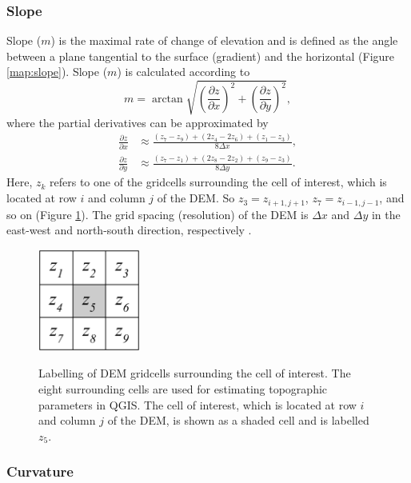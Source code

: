 \documentclass{sfuthesis}
\begin{document}
\subsubsection*{Slope} 

Slope ($m$) is the maximal rate of change of elevation and is defined as the angle between a plane tangential to the surface (gradient) and the horizontal \citep{Olaya2009} (Figure \ref{map:slope}). Slope ($m$) is calculated according to 
\begin{equation}
m = \arctan \sqrt{\left( \frac{\partial z}{\partial x} \right) ^2 + \left( \frac{\partial z}{\partial y} \right) ^2},
\end{equation}
where the partial derivatives can be approximated by \citep{Mitavsova1993, Neteler2008, Hofierka2009}
\begin{align} \label{eq:firstpartial}
\frac{\partial z}{\partial x} &\approx \frac{(z_7-z_9)+(2z_4-2z_6)+(z_1-z_3)}{8  \Delta x},\nonumber \\
\frac{\partial z}{\partial y} &\approx \frac{(z_7-z_1)+(2z_8-2z_2)+(z_9-z_3)}{8  \Delta y}.
\end{align}
Here, $z_k$ refers to one of the gridcells surrounding the cell of interest, which is located at row $i$ and column $j$ of the DEM. So $z_3 = z_{i+1,j+1}$, $z_7 = z_{i-1,j-1}$, and so on (Figure \ref{fig:DEMgrid}). The grid spacing (resolution) of the DEM is $\Delta x$ and $\Delta y$ in the east-west and north-south direction, respectively \citep{Neteler2008}. 

\begin{figure}[h]
	\centering
	\includegraphics[width = 0.3\textwidth]{DEMGrid.png}\\
	\caption{Labelling of DEM gridcells surrounding the cell of interest. The eight surrounding cells are used for estimating topographic parameters in QGIS. The cell of interest, which is located at row $i$ and column $j$ of the DEM, is shown as a shaded cell and is labelled $z_5$.}
	\label{fig:DEMgrid}
\end{figure}

\subsubsection*{Curvature} 
\end{document}
